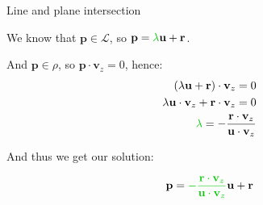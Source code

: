 \documentclass{beamer}
\begin{document}
\begin{frame}{Line and plane intersection}
	\begin{flushleft}
		
		We know that $\mathbf p \in \mathcal L$, so $\mathbf p = \textcolor{mygreen}{\lambda} \mathbf u + \mathbf r$.
		
		\bigskip
		
		And $\mathbf p \in \rho$, so $\mathbf p \cdot \mathbf v_z = 0$, hence:
		\begin{align}
			(\lambda \mathbf u + \mathbf r) \cdot \mathbf v_z = 0 \\
			\lambda \mathbf u \cdot \mathbf v_z + \mathbf r \cdot \mathbf v_z = 0 \\
			\textcolor{mygreen}{\lambda} = - \frac{\mathbf r \cdot \mathbf v_z}{ \mathbf u \cdot \mathbf v_z}
		\end{align}
		
		\bigskip
		
		And thus we get our solution:
		
		\begin{equation}
			\mathbf p =\textcolor{mygreen}{
			 - \frac{\mathbf r \cdot \mathbf v_z}{ \mathbf u \cdot \mathbf v_z}
		     } \mathbf u + \mathbf r
		\end{equation}
		
	\end{flushleft}
\end{frame}
\end{document}
